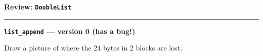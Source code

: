 \documentclass[oneside, landscape]{article}
\begin{document}
\small


\begin{minipage}[t]{0.40\textwidth}

\textbf{Review: \texttt{DoubleList}}

\vspace{0.5em}

%


\vspace{1em}
\hrule
\vspace{1em}

\textbf{\texttt{list\_append} --- version 0 (has a bug!)}

\vspace{0.5em}



\vspace{0.5em}



\vspace{0.5em}

Draw a picture of where the 24 bytes in 2 blocks are lost.

\vspace{4\baselineskip}

\end{minipage}
\hfill
\end{document}
